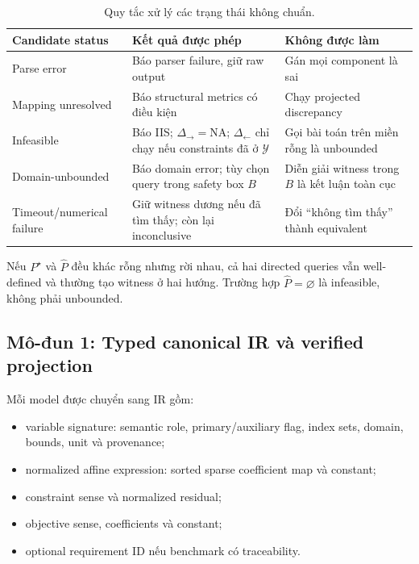 \documentclass[11pt,a4paper]{article}
\begin{document}
\begin{table}[htbp]
\centering
\caption{Quy tắc xử lý các trạng thái không chuẩn.}
\small
\begin{tabularx}{\textwidth}{L{3.1cm} Y Y}
\toprule
\textbf{Candidate status} & \textbf{Kết quả được phép} & \textbf{Không được làm} \\
\midrule
Parse error & Báo parser failure, giữ raw output & Gán mọi component là sai \\
Mapping unresolved & Báo structural metrics có điều kiện & Chạy projected discrepancy \\
Infeasible & Báo IIS; \(\Delta_{\rightarrow}=\mathrm{NA}\); \(\Delta_{\leftarrow}\) chỉ chạy nếu constraints đã ở \(\mathcal Y\) & Gọi bài toán trên miền rỗng là unbounded \\
Domain-unbounded & Báo domain error; tùy chọn query trong safety box \(B\) & Diễn giải witness trong \(B\) là kết luận toàn cục \\
Timeout/numerical failure & Giữ witness dương nếu đã tìm thấy; còn lại inconclusive & Đổi ``không tìm thấy'' thành equivalent \\
\bottomrule
\end{tabularx}
\end{table}

Nếu \(P^\star\) và \(\widehat P\) đều khác rỗng nhưng rời nhau, cả hai directed
queries vẫn well-defined và thường tạo witness ở hai hướng. Trường hợp
\(\widehat P=\varnothing\) là infeasible, không phải unbounded.

\subsection{Mô-đun 1: Typed canonical IR và verified projection}

Mỗi model được chuyển sang IR gồm:

\begin{itemize}
  \item variable signature: semantic role, primary/auxiliary flag, index sets,
  domain, bounds, unit và provenance;
  \item normalized affine expression: sorted sparse coefficient map và constant;
  \item constraint sense và normalized residual;
  \item objective sense, coefficients và constant;
  \item optional requirement ID nếu benchmark có traceability.
\end{itemize}
\end{document}
